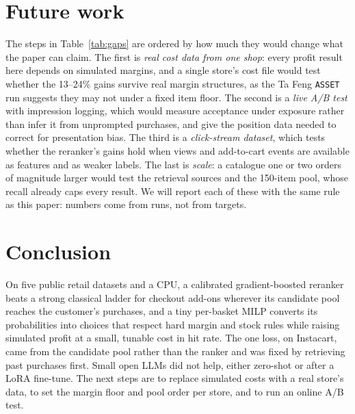 \documentclass[11pt]{article}
\begin{document}
\section{Future work}
The steps in Table~\ref{tab:gaps} are ordered by how much they would change what the paper can claim.
The first is \emph{real cost data from one shop}: every profit result here depends on simulated margins, and a single store's cost file would test whether the 13--24\% gains survive real margin structures, as the Ta Feng \texttt{ASSET} run suggests they may not under a fixed item floor.
The second is a \emph{live A/B test} with impression logging, which would measure acceptance under exposure rather than infer it from unprompted purchases, and give the position data needed to correct for presentation bias.
The third is a \emph{click-stream dataset}, which tests whether the reranker's gains hold when views and add-to-cart events are available as features and as weaker labels.
The last is \emph{scale}: a catalogue one or two orders of magnitude larger would test the retrieval sources and the 150-item pool, whose recall already caps every result.
We will report each of these with the same rule as this paper: numbers come from runs, not from targets.

\section{Conclusion}
On five public retail datasets and a CPU, a calibrated gradient-boosted reranker beats a strong classical ladder for checkout add-ons wherever its candidate pool reaches the customer's purchases, and a tiny per-basket MILP converts its probabilities into choices that respect hard margin and stock rules while raising simulated profit at a small, tunable cost in hit rate.
The one loss, on Instacart, came from the candidate pool rather than the ranker and was fixed by retrieving past purchases first.
Small open LLMs did not help, either zero-shot or after a LoRA fine-tune.
The next steps are to replace simulated costs with a real store's data, to set the margin floor and pool order per store, and to run an online A/B test.
\end{document}
